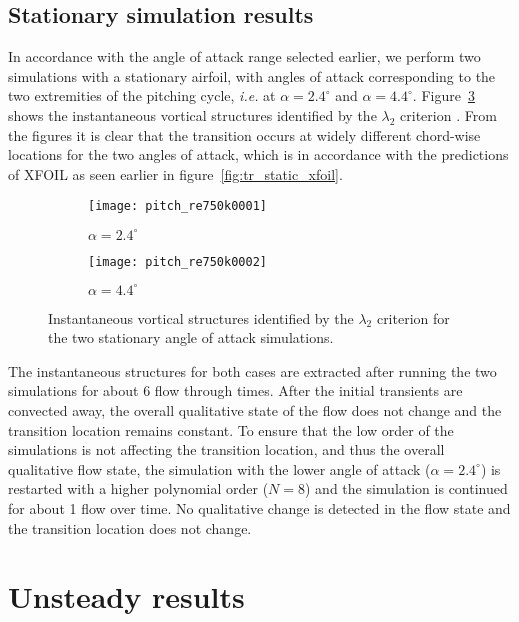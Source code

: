 \subsection{Stationary simulation results}

In accordance with the angle of attack range selected earlier, we perform two simulations with a stationary airfoil, with angles of attack corresponding to the two extremities of the pitching cycle, \textit{i.e.} at $\alpha=2.4^{\circ}$ and $\alpha=4.4^{\circ}$. Figure~\ref{fig:la2_750k_stationary} shows the instantaneous vortical structures identified by the $\lambda_{2}$ criterion \citep{jeong95}. From the figures it is clear that the transition occurs at widely different chord-wise locations for the two angles of attack, which is in accordance with the predictions of XFOIL as seen earlier in figure~\ref{fig:tr_static_xfoil}.
\begin{figure}[h]
	\centering
	\begin{subfigure}[t]{0.9\textwidth}
		\texttt{[image: pitch\_re750k0001]}
		\caption{$\alpha=2.4^{\circ}$}
		\label{fig:la2_aoa24}
	\end{subfigure}
	\begin{subfigure}[t]{0.9\textwidth}
		\texttt{[image: pitch\_re750k0002]}
		\caption{$\alpha=4.4^{\circ}$}
		\label{fig:la2_aoa44}		
	\end{subfigure}	
	\caption{Instantaneous vortical structures identified by the $\lambda_{2}$ criterion for the two stationary angle of attack simulations.}
	\label{fig:la2_750k_stationary}
\end{figure}
The instantaneous structures for both cases are extracted after running the two simulations for about 6 flow through times. After the initial transients are convected away, the overall qualitative state of the flow does not change and the transition location remains constant. To ensure that the low order of the simulations is not affecting the transition location, and thus the overall qualitative flow state, the simulation with the lower angle of attack ($\alpha=2.4^{\circ}$) is restarted with a higher polynomial order ($N=8$) and the simulation is continued for about 1 flow over time. No qualitative change is detected in the flow state and the transition location does not change.

\section{Unsteady results}

